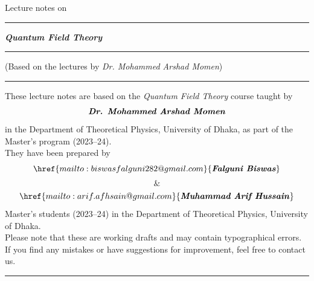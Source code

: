 \documentclass[14pt]{article} %
\begin{document}
\begin{titlepage}
    \centering
    \vspace*{3cm}
    {Lecture notes on \par}
    \vspace{1cm}
    \hrule
    \vspace{1cm}
    {\huge \textit{\textbf{Quantum Field Theory}} \par}
    \vspace{1cm}
    \hrule
    \vspace{1cm}
    \small
   (Based on the lectures by \textit{Dr. Mohammed Arshad Momen})
\vspace{3cm}
\end{titlepage}

\newpage
\thispagestyle{empty} %

\vspace*{6cm} %
\hrule
\vspace*{1.5cm}
\begin{center}
    \begin{minipage}{0.85\textwidth}
        \centering
        
        These lecture notes are based on the \textit{Quantum Field Theory} course taught by $${\textbf{\textit{Dr. Mohammed Arshad Momen}}}$$ in the Department of Theoretical Physics, University of Dhaka, as part of the Master's program (2023–24). \\
        \vspace{0.6cm}
        They have been prepared by $$\href{mailto:biswasfalguni282@gmail.com}{\textbf{\textit{Falguni Biswas}}}$$ $$\textbf{\&}$$ $$\href{mailto:arif.afhsain@gmail.com}{\textbf{\textit{Muhammad Arif Hussain}}}$$ Master's students (2023–24) in the Department of Theoretical Physics, University of Dhaka.\\
        \vspace{0.6cm}
        Please note that these are working drafts and may contain typographical errors. If you find any mistakes or have suggestions for improvement, feel free to contact us.
    \end{minipage}
\end{center}
\vspace*{1.5cm}
\hrule
\vspace*{\fill} %
\newpage
\tableofcontents
\newpage
\end{document}

